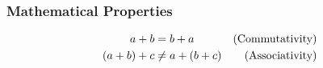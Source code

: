 \begin{frame}

\frametitle{Mathematical Properties}

\begin{align*}
a + b &= b + a & \text{(Commutativity)} \\
 \mathopen{}\left(a + b\right)\mathclose{}  + c &\neq a +  \mathopen{}\left(b + c\right)\mathclose{}  & \text{(Associativity)}
\end{align*}

\end{frame}
